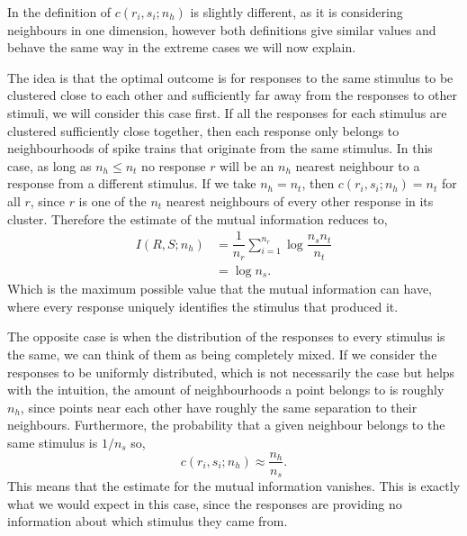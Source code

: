 \documentclass[10pt,a4paper]{book}
\begin{document}
In \cite{Houghton13} the definition of $c(r_i, s_i; n_h)$ is slightly different, as it is considering neighbours in one dimension, however both definitions give similar values and behave the same way in the extreme cases we will now explain.

The idea is that the optimal outcome is for responses to the same stimulus to be clustered close to each other and sufficiently far away from the responses to other stimuli, we will consider this case first. If all the responses for each stimulus are clustered sufficiently close together, then each response only belongs to neighbourhoods of spike trains that originate from the same stimulus. In this case, as long as $n_h \leq n_t$ no response $r$ will be an $n_h$ nearest neighbour to a response from a different stimulus. If we take $n_h = n_t$, then $c(r_i, s_i; n_h) = n_t$ for all $r$, since $r$ is one of the $n_t$ nearest neighbours of every other response in its cluster. Therefore the estimate of the mutual information reduces to,
\begin{align}
I(R,S;n_h) & = \dfrac{1}{n_r} \sum_{i = 1}^{n_r}	\log \dfrac{n_s n_t}{n_t} \nonumber \\
& = \log n_s.
\end{align}
Which is the maximum possible value that the mutual information can have, where every response uniquely identifies the stimulus that produced it.

The opposite case is when the distribution of the responses to every stimulus is the same, we can think of them as being completely mixed. If we consider the responses to be uniformly distributed, which is not necessarily the case but helps with the intuition, the amount of neighbourhoods a point belongs to is roughly $n_h$, since points near each other have roughly the same separation to their neighbours. Furthermore, the probability that a given neighbour belongs to the same stimulus is $1/n_s$ so,
\begin{equation}
c(r_i, s_i; n_h) \approx \dfrac{n_h}{n_s}.
\end{equation}
This means that the estimate for the mutual information vanishes. This is exactly what we would expect in this case, since the responses are providing no information about which stimulus they came from.
\end{document}
